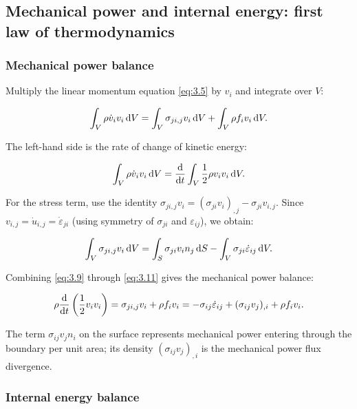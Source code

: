 \subsection{Mechanical power and internal energy: first law of thermodynamics}
\label{sec:3.3}

\subsubsection{Mechanical power balance}

Multiply the linear momentum equation \eqref{eq:3.5} by $v_i$ and integrate over $V$:

\begin{equation}
\int_V \rho \dot{v}_i v_i \, \mathrm{d} V
=
\int_V \sigma_{ji,j} v_i \, \mathrm{d} V
+
\int_V \rho f_i v_i \, \mathrm{d} V.
\label{eq:3.9}
\end{equation}

The left-hand side is the rate of change of kinetic energy:

\begin{equation}
\int_V \rho \dot{v}_i v_i \, \mathrm{d} V
=
\frac{\mathrm{d}}{\mathrm{d} t} \int_V \frac{1}{2}\rho v_i v_i \, \mathrm{d} V.
\label{eq:3.10}
\end{equation}

For the stress term, use the identity $\sigma_{ji,j}v_i = (\sigma_{ji}v_i)_{,j} - \sigma_{ji}v_{i,j}$. Since $v_{i,j} = \dot{u}_{i,j} = \dot{\varepsilon}_{ji}$ (using symmetry of $\sigma_{ji}$ and $\varepsilon_{ij}$), we obtain:

\begin{equation}
\int_V \sigma_{ji,j} v_i \, \mathrm{d} V
=
\int_S \sigma_{ji} v_i n_j \, \mathrm{d} S
-
\int_V \sigma_{ji} \dot{\varepsilon}_{ij} \, \mathrm{d} V.
\label{eq:3.11}
\end{equation}

Combining \eqref{eq:3.9} through \eqref{eq:3.11} gives the mechanical power balance:

\begin{equation}
\rho \frac{\mathrm{d}}{\mathrm{d} t}\left(\frac{1}{2}v_i v_i\right)
=
\sigma_{ji,j}v_i + \rho f_i v_i
=
-\sigma_{ij}\dot{\varepsilon}_{ij} + (\sigma_{ij}v_j)_{,i} + \rho f_i v_i.
\label{eq:3.12}
\end{equation}

The term $\sigma_{ij}v_j n_i$ on the surface represents mechanical power entering through the boundary per unit area; its density $(\sigma_{ij}v_j)_{,i}$ is the mechanical power flux divergence.

\subsubsection{Internal energy balance}

